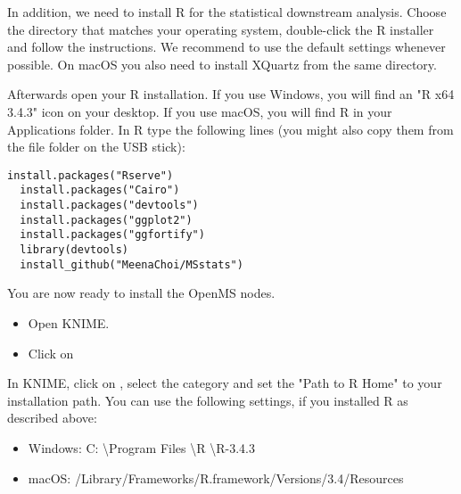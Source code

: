 In addition, we need to install R for the statistical downstream analysis. Choose the directory that matches your operating system, double-click the R installer and follow the instructions. We recommend to use the default settings whenever possible. On macOS you also need to install XQuartz from the same directory.

Afterwards open your R installation. If you use Windows, you will find an "R x64 3.4.3" icon on your desktop. If you use macOS, you will find R in your Applications folder. In R type the following lines (you might also copy them from the file  folder on the USB stick):
\begin{lstlisting}[aboveskip=8pt]
  install.packages("Rserve")
  install.packages("Cairo")
  install.packages("devtools")
  install.packages("ggplot2")
  install.packages("ggfortify")
  library(devtools)
  install_github("MeenaChoi/MSstats")
\end{lstlisting}

You are now ready to install the OpenMS nodes.

\begin{itemize}
  \item Open KNIME.
  \item Click on 
\end{itemize}


In KNIME, click on , select the category  and set the "Path to R Home" to your installation path. You can use the following settings, if you installed R as described above:
\begin{itemize}
\item Windows: C: \textbackslash Program Files \textbackslash R \textbackslash R-3.4.3 
\item macOS: /Library/Frameworks/R.framework/Versions/3.4/Resources 
\end{itemize}

